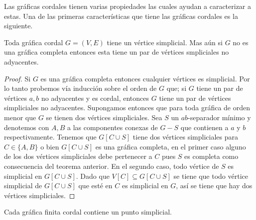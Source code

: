 Las gráficas cordales tienen varias propiedades las cuales ayudan a caracterizar a estas. Una de las primeras características que tiene las gráficas cordales es la siguiente.

\begin{teorema}
\label{teo:103}
    Toda gráfica cordal $G=(V,E)$ tiene un vértice simplicial. Mas aún si $G$ no es una gráfica completa entonces esta tiene un par de vértices smpliciales no adyacentes.
\end{teorema}

\begin{proof}
    Si $G$ es una gráfica completa entonces cualquier vértices es simplicial. Por lo tanto probemos vía inducción sobre el orden de $G$ que; si $G$ tiene un par de vértices $a,b$ no adyacentes y es cordal, entonces $G$ tiene un par de vértices simpliciales no adyacentes. Supongamos entonces que para toda gráfica de orden menor que $G$ se tienen dos vértices simpliciales. Sea $S$ un $ab$-separador mínimo y denotemos con $A,B$ a las componentes conexas de $G-S$ que contienen a $a$ y $b$ respectivamente. Tenemos que $G[C \cup S]$ tiene dos vértices simpliciales para $C\in \{A,B\}$ o bien $G[C \cup S]$ es una gráfica completa, en el primer caso alguno de los dos vértices simpliciales debe pertenecer a $C$ pues $S$ es completa como consecuencia del teorema anterior. En el segundo caso, todo vértice de $S$ es simplicial en $G[C \cup S]$. Dado que $V[C]\subseteq G[C \cup S]$ se tiene que todo vértice simplicial de $G[C \cup S]$ que esté en $C$ es simplicial en $G$, así se tiene que hay dos vértices simpliciales.
\end{proof}

\begin{teorema}
    Cada gráfica finita cordal contiene un punto simplicial.
\end{teorema}

